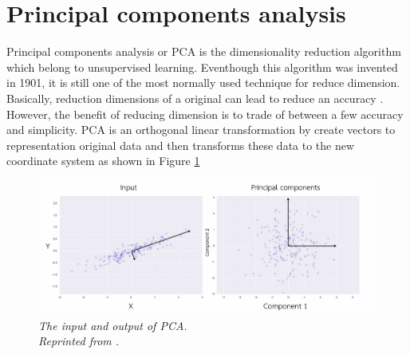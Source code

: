 \section{Principal components analysis}
Principal components analysis or PCA is the dimensionality reduction algorithm which belong to unsupervised learning. Eventhough this algorithm was invented in 1901, it is still one of the most normally used technique for reduce dimension. Basically, reduction dimensions of a original can lead to reduce an accuracy \cite{patel_2019}. However, the benefit of reducing dimension is to trade of between a few accuracy and simplicity. PCA is an orthogonal linear transformation by create vectors to representation original data and then transforms these data to the new coordinate system \cite{vanderplas_2017} as shown in Figure \ref{fig:pca}

\begin{figure}[H]
  \centering
  \caption[The input and output of PCA.]{\emph{The input and output of PCA. \\ Reprinted from \citeauthor{vanderplas_2017} \citeyear{vanderplas_2017}.}}\label{fig:pca}
  \includegraphics[scale = 0.13]{figures/pca.jpg}
\end{figure}

\FloatBarrier